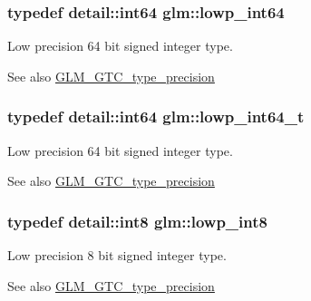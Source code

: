 \subsubsection[{\texorpdfstring{lowp\+\_\+int64}{lowp_int64}}]{\setlength{\rightskip}{0pt plus 5cm}typedef detail\+::int64 {\bf glm\+::lowp\+\_\+int64}}\hypertarget{group__gtc__type__precision_gab8a8e75af347592406e41b3ae2c0712b}{}\label{group__gtc__type__precision_gab8a8e75af347592406e41b3ae2c0712b}
Low precision 64 bit signed integer type. \begin{DoxySeeAlso}{See also}
\hyperlink{group__gtc__type__precision}{G\+L\+M\+\_\+\+G\+T\+C\+\_\+type\+\_\+precision} 
\end{DoxySeeAlso}
\subsubsection[{\texorpdfstring{lowp\+\_\+int64\+\_\+t}{lowp_int64_t}}]{\setlength{\rightskip}{0pt plus 5cm}typedef detail\+::int64 {\bf glm\+::lowp\+\_\+int64\+\_\+t}}\hypertarget{group__gtc__type__precision_ga14d72e76d57c7f28eca8e933816c9fd6}{}\label{group__gtc__type__precision_ga14d72e76d57c7f28eca8e933816c9fd6}
Low precision 64 bit signed integer type. \begin{DoxySeeAlso}{See also}
\hyperlink{group__gtc__type__precision}{G\+L\+M\+\_\+\+G\+T\+C\+\_\+type\+\_\+precision} 
\end{DoxySeeAlso}
\subsubsection[{\texorpdfstring{lowp\+\_\+int8}{lowp_int8}}]{\setlength{\rightskip}{0pt plus 5cm}typedef detail\+::int8 {\bf glm\+::lowp\+\_\+int8}}\hypertarget{group__gtc__type__precision_gaf9e675b6392764242ae87eb179e9d3d6}{}\label{group__gtc__type__precision_gaf9e675b6392764242ae87eb179e9d3d6}
Low precision 8 bit signed integer type. \begin{DoxySeeAlso}{See also}
\hyperlink{group__gtc__type__precision}{G\+L\+M\+\_\+\+G\+T\+C\+\_\+type\+\_\+precision} 
\end{DoxySeeAlso}
